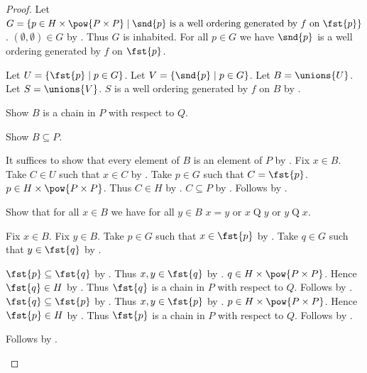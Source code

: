 \begin{proof}
    Let $G=\{p\in H\times\pow{P\times P}\mid \text{$\snd{p}$ is a well ordering generated by $f$ on $\fst{p}$}\}$.
    $(\emptyset,\emptyset)\in G$
        by .
    Thus $G$ is inhabited.
    For all $p\in G$ we have $\snd{p}$ is a well ordering generated by $f$ on $\fst{p}$.

    Let $U=\{\fst{p}\mid p\in G\}$.
    Let $V=\{\snd{p}\mid p\in G\}$.
    Let $B=\unions{U}$.
    Let $S=\unions{V}$.
    $S$ is a well ordering generated by $f$ on $B$ by .

    Show $B$ is a chain in $P$ with respect to $Q$.
    \begin{subproof}
        Show $B\subseteq P$.
        \begin{subproof}
            It suffices to show that every element of $B$ is an element of $P$ by .
            Fix $x\in B$.
            Take $C\in U$ such that $x\in C$ by .
            Take $p\in G$ such that $C=\fst{p}$.
            $p\in H\times\pow{P\times P}$.
            Thus $C\in H$ by .
            $C\subseteq P$ by .
            Follows by .
        \end{subproof}
        Show that for all $x\in B$ we have for all $y\in B$
            $x=y$ or $x\mathrel{Q}y$ or $y\mathrel{Q}x$.
        \begin{subproof}
            Fix $x\in B$.
            Fix $y\in B$.
            Take $p\in G$ such that $x\in\fst{p}$ by .
            Take $q\in G$ such that $y\in\fst{q}$ by .
            \begin{byCase}
                    $\fst{p}\subseteq\fst{q}$
                        by .
                    Thus $x,y\in\fst{q}$ by .
                    $q\in H\times\pow{P\times P}$.
                    Hence $\fst{q}\in H$ by .
                    Thus $\fst{q}$ is a chain in $P$ with respect to $Q$.
                    Follows by .
                    $\fst{q}\subseteq\fst{p}$
                        by .
                    Thus $x,y\in\fst{p}$ by .
                    $p\in H\times\pow{P\times P}$.
                    Hence $\fst{p}\in H$ by .
                    Thus $\fst{p}$ is a chain in $P$ with respect to $Q$.
                    Follows by .
            \end{byCase}
        \end{subproof}
        Follows by .
    \end{subproof}


\end{proof}
